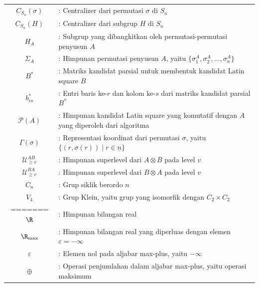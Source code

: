 \begin{longtable}{c p{14cm}}
  $C_{S_n}(\sigma)$          & : Centralizer dari permutasi $\sigma$ di $S_n$                                                     \\
  $C_{S_n}(H)$               & : Centralizer dari subgrup $H$ di $S_n$                                                            \\
  $H_A$                      & : Subgrup yang dibangkitkan oleh permutasi-permutasi penyusun $A$                                  \\
  $\Sigma_A$                 & : Himpunan permutasi penyusun $A$, yaitu $\{\sigma_1^A,\sigma_2^A,\ldots,\sigma_n^A\}$             \\
  $B^*$                      & : Matriks kandidat parsial untuk membentuk kandidat Latin square $B$                               \\
  $b^*_{rs}$                 & : Entri baris ke-$r$ dan kolom ke-$s$ dari matriks kandidat parsial $B^*$                          \\
  $\mathcal{P}(A)$           & : Himpunan kandidat Latin square yang komutatif dengan $A$ yang diperoleh dari algoritma           \\
  $\Gamma(\sigma)$           & : Representasi koordinat dari permutasi $\sigma$, yaitu $\{(r,\sigma(r))\mid r\in \underline{n}\}$ \\
  $\mathcal{U}_{\ge v}^{AB}$ & : Himpunan superlevel dari $A\otimes B$ pada level $v$                                             \\
  $\mathcal{U}_{\ge v}^{BA}$ & : Himpunan superlevel dari $B\otimes A$ pada level $v$                                             \\
  $C_n$                      & : Grup siklik berordo $n$                                                                          \\
  $V_4$                      & : Grup Klein, yaitu grup yang isomorfik dengan $C_2\times C_2$                                     \\
=======
  $\R$                       & : Himpunan bilangan real                                                                 \\
  $\R_{\max}$                & : Himpunan bilangan real yang diperluas dengan elemen $\varepsilon=-\infty$              \\
  $\varepsilon$              & : Elemen nol pada aljabar max-plus, yaitu $-\infty$                                      \\
  $\oplus$                   & : Operasi penjumlahan dalam aljabar max-plus, yaitu operasi maksimum                     \\

\end{longtable}
